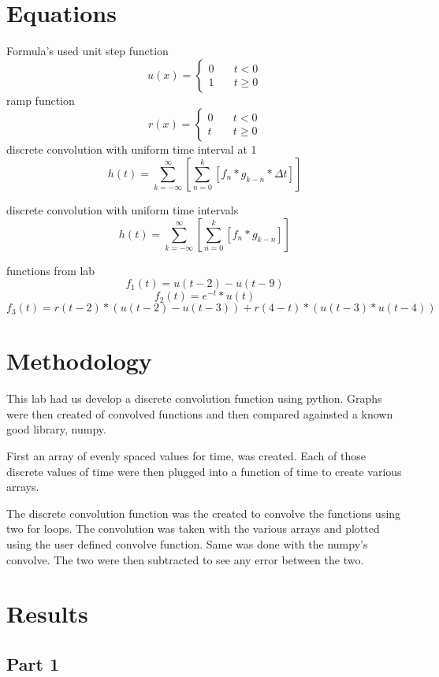 \documentclass[12pt,a4paper]{article}
\begin{document}
\section{Equations}\label{sec:lit-rev}
Formula's used
unit step function
\[
u(x) = \left\{
        \begin{array}{ll}
            0 & \quad t < 0 \\
            1 & \quad t \geq 0
        \end{array}
    \right.
\]
ramp function
\[
r(x) = \left\{
        \begin{array}{ll}
            0 & \quad t < 0 \\
            t & \quad t \geq 0
        \end{array}
    \right.
\]
discrete convolution with uniform time interval at 1
\[h(t) = \sum_{k=-\infty}^{\infty} {\left [ \sum_{n=0}^{k} {\left [ f_n*g_{k-n}* \Delta t\right ]} \right ]}\]

discrete convolution with uniform time intervals
\[h(t) = \sum_{k=-\infty}^{\infty} {\left [ \sum_{n=0}^{k} {\left [ f_n*g_{k-n}\right ]} \right ]}\]

functions from lab
\[f_1(t) = u(t-2)-u(t-9)\]
\[f_2(t) = e^{-t}*u(t)\]
\[f_3(t) = r(t-2)*(u(t-2)-u(t-3))+r(4-t)*(u(t-3)*u(t-4))\]


\section{Methodology}\label{sec:meth}
This lab had us develop a discrete convolution function using python.  Graphs were then created of convolved functions and then compared againsted a known good library, numpy. 

First an array of evenly spaced values for time, was created. Each of those discrete values of time were then plugged into a function of time to create various arrays.

The discrete convolution function was the created to convolve the functions using two for loops. The convolution was taken with the various arrays and plotted using the user defined convolve function. Same was done with the numpy's convolve.  The two were then subtracted to see any error between the two.

\section{Results}\label{sec:res}
\subsection*{Part 1}
\end{document}
